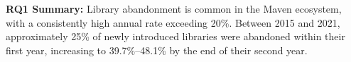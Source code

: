 


\vspace{-0.1cm}
\begin{tcolorbox}[colframe=white, colback=blue!5, left=1mm, right=1mm, sharp corners]
\textbf{RQ1 Summary:} Library abandonment is common in the Maven ecosystem, with a consistently high annual rate exceeding 20\%. Between 2015 and 2021, approximately 25\% of newly introduced libraries were abandoned within their first year, increasing to 39.7\%–48.1\% by the end of their second year.
\end{tcolorbox}

